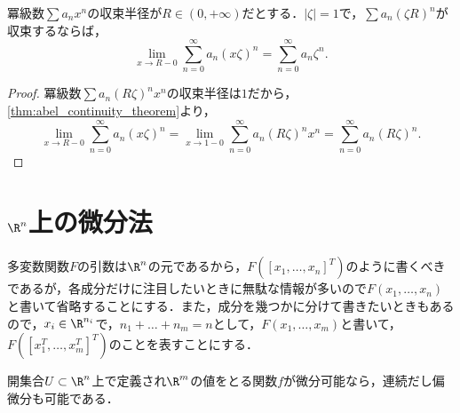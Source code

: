 \documentclass[a4paper,10pt]{ltjsarticle}
\begin{document}
\begin{MyCorollary}
  冪級数\(\sum a_n x^n\)の収束半径が\(R\in(0, +\infty)\)だとする．\(|\zeta| = 1\)で，\(\sum a_n (\zeta R)^n\)が収束するならば，
  \[ \lim_{x \to R-0} \sum_{n=0}^\infty a_n (x\zeta)^n = \sum_{n=0}^\infty a_n \zeta^n. \]
\end{MyCorollary}
\begin{proof}
  冪級数\(\sum a_n (R\zeta)^n x^n\)の収束半径は\(1\)だから，\cref{thm:abel_continuity_theorem}より，
  \[ \lim_{x \to R-0} \sum_{n=0}^\infty a_n (x\zeta)^n = \lim_{x \to 1-0} \sum_{n=0}^\infty a_n (R\zeta)^n x^n = \sum_{n=0}^\infty a_n (R\zeta)^n. \]
\end{proof}


\section{\texorpdfstring{\(\R^n\)}{Rn}上の微分法}
\label{sec:differentiation_Rn}

多変数関数\(F\)の引数は\(\R^n\)の元であるから，\(F([x_1, \dots, x_n]^T)\)のように書くべきであるが，各成分だけに注目したいときに無駄な情報が多いので\(F(x_1, \dots, x_n)\)と書いて省略することにする．また，成分を幾つかに分けて書きたいときもあるので，\(x_i \in \R^{n_i}\)で，\(n_1 + \dots + n_m = n\)として，\(F(x_1, \dots, x_m)\)と書いて，\(F([x_1^T, \dots, x_m^T]^T)\)のことを表すことにする．



開集合$U\subset \R^n$上で定義され$\R^m$の値をとる関数$f$が微分可能なら，連続だし偏微分も可能である．
\end{document}

